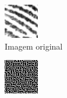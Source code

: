 \documentclass[10pt,a4paper]{article}
\begin{document}
\begin{figure}[!ht]
    \centering
    \begin{subfigure}[ht]{0.20\textwidth}
        \includegraphics[width=\textwidth]{3.jpg}
        \caption{Imagem original}
    \end{subfigure}
    \qquad
    \begin{subfigure}[ht]{0.20\textwidth}
        \includegraphics[width=\textwidth]{3_filtered_window_3.jpg}

\end{subfigure}
\end{figure}
\end{document}
